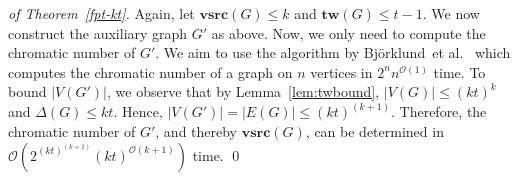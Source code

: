\documentclass[letter,runningheads,envcountsame,envcountsect]{llncs}
\newcommand{\mso}{$\textup{MSO}_2$}
\newcommand{\vsrc}{\mathbf{vsrc}}
\newcommand{\src}{\mathbf{src}}
\newcommand{\tw}{\mathbf{tw}}
\newcommand{\kvsrc}{{\sc $k$-Vsrc}}
\newcommand{\etal}{et al.}
\newcommand{\order}{\mathcal{O}}
\begin{document}
\begin{proof}[of Theorem~\ref{fpt-kt}]
Again, let $\vsrc(G) \leq k$ and $\tw(G) \leq t-1$.
We now construct the auxiliary graph $G'$ as above.  Now, we only need to compute the chromatic number of $G'$.
We aim to use the algorithm by Bj\"orklund~\etal~\cite{bjorklund} which computes the chromatic number of a graph on $n$ vertices in $2^n n^{\order(1)}$ time. To bound $|V(G')|$, we observe that by Lemma~\ref{lem:twbound}, $|V(G)| \leq (kt)^k$ and $\Delta(G) \leq kt$. Hence, $|V(G')| = |E(G)| \leq (kt)^{(k+1)}$. Therefore, the chromatic number of $G'$, and thereby $\vsrc(G)$, can be determined in $\order(2^{(kt)^{(k+1)}} (kt)^{\order(k+1)})$ time.
\qed\end{proof}
%


%
%
%
%
%
%
\end{document}
